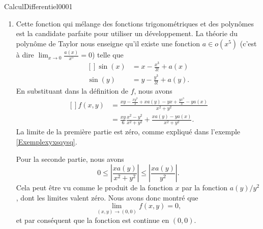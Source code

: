 \begin{corrige}{CalculDifferentiel0001}
\begin{enumerate}
		\item
			Cette fonction qui mélange des fonctions trigonométriques et des polynômes est la candidate parfaite pour utiliser un développement. La théorie du polynôme de Taylor nous enseigne qu'il existe une fonction $a\in o(x^5)$ (c'est à dire $\lim_{x\to 0} \frac{ a(x) }{ x^5 }=0$) telle que
			\begin{equation}
				\begin{aligned}[]
					\sin(x)&=x-\frac{ x^3 }{ 3! }+a(x)\\
					\sin(y)&=y-\frac{ y^3 }{ 3! }+a(y).
				\end{aligned}
			\end{equation}
			En substituant dans la définition de $f$, nous avons
			\begin{equation}
				\begin{aligned}[]
					f(x,y)&=\frac{ xy-\frac{ xy^3 }{3} +xa(y)-yx+\frac{ yx^3 }{ 3 }-ya(x) } { x^2+y^2 }\\
					&=\frac{ xy }{ 6 }\frac{ x^2-y^2 }{ x^2+y^2 }+\frac{ xa(y)-ya(x) }{ x^2+y^2 }.
				\end{aligned}
			\end{equation}
			La limite de la première partie est zéro, comme expliqué dans l'exemple \ref{Exemplexyxsqysq}.

			Pour la seconde partie, nous avons
			\begin{equation}
				0\leq\left| \frac{ xa(y) }{ x^2+y^2 } \right| \leq\left| \frac{ xa(y) }{ y^2 } \right| .
			\end{equation}
			Cela peut être vu comme le produit de la fonction $x$ par la fonction $a(y)/y^2$, dont les limites valent zéro. Nous avons donc montré que
			\begin{equation}
				\lim_{(x,y)\to(0,0)}f(x,y)=0,
			\end{equation}
			et par conséquent que la fonction est continue en $(0,0)$.


\end{enumerate}
\end{corrige}
